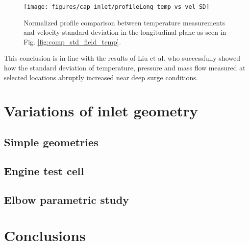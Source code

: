 \begin{figure}[thb!]
\centering
\texttt{[image: figures/cap\_inlet/profileLong\_temp\_vs\_vel\_SD]}
\caption{Normalized profile comparison between temperature measurements and velocity standard deviation in the longitudinal plane as seen in Fig. \ref{fig:comp_std_field_temp}.}
\label{fig:profiles_temp_vs_vel_long_SD}
\end{figure}

This conclusion is in line with the results of Liu et al. \cite{liu2013methods} who successfully showed how the standard deviation of temperature, pressure and mass flow measured at selected locations abruptly increased near deep surge conditions. 

\section{Variations of inlet geometry}
\label{sec:inlet_geo_var}

\subsection{Simple geometries}
\subsection{Engine test cell}
\subsection{Elbow parametric study}

\section{Conclusions}